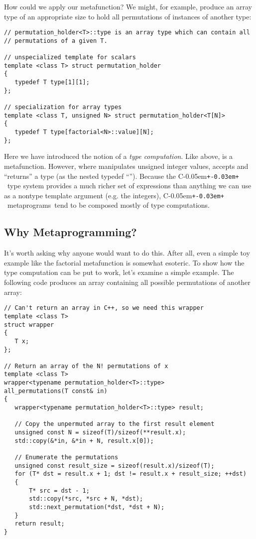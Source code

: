 \documentclass{netobjectdays}
\newcommand{\Cpp}{C\kern-0.05em\texttt{+\kern-0.03em+}%
}
\newcommand{\mpgms}{meta\-programs}
\newcommand{\mfn}{meta\-function}
\begin{document}
How could we apply our  \mfn{}? We might, for example,
produce an array type of an appropriate size to hold all permutations
of instances of another type:

{\footnotesize
\begin{verbatim}
// permutation_holder<T>::type is an array type which can contain all
// permutations of a given T.

// unspecialized template for scalars
template <class T> struct permutation_holder
{
   typedef T type[1][1];
};

// specialization for array types
template <class T, unsigned N> struct permutation_holder<T[N]>
{
   typedef T type[factorial<N>::value][N];
};
\end{verbatim}
}

Here we have introduced the notion of a \emph{type computation}.  Like
 above,  is a
\mfn{}. However, where  manipulates unsigned integer
values,  accepts and ``returns'' a
type (as the nested typedef ``''). Because the \Cpp\ type
system provides a much richer set of expressions than anything we can
use as a nontype template argument (e.g. the integers), \Cpp\ \mpgms\
tend to be composed mostly of type computations.

\subsection{Why Metaprogramming?}

It's worth asking why anyone would want to do this. After all, even a
simple toy example like the factorial metafunction is somewhat
esoteric. To show how the type computation can be put to work, let's
examine a simple example. The following code produces an array
containing all possible permutations of another array:
{\footnotesize
\begin{verbatim}
// Can't return an array in C++, so we need this wrapper
template <class T>
struct wrapper
{
   T x;
};

// Return an array of the N! permutations of x
template <class T>
wrapper<typename permutation_holder<T>::type>
all_permutations(T const& in)
{
   wrapper<typename permutation_holder<T>::type> result;

   // Copy the unpermuted array to the first result element
   unsigned const N = sizeof(T)/sizeof(**result.x);
   std::copy(&*in, &*in + N, result.x[0]);

   // Enumerate the permutations
   unsigned const result_size = sizeof(result.x)/sizeof(T);
   for (T* dst = result.x + 1; dst != result.x + result_size; ++dst)
   {
       T* src = dst - 1;
       std::copy(*src, *src + N, *dst);
       std::next_permutation(*dst, *dst + N);
   }
   return result;
}
\end{verbatim}
}
\end{document}
